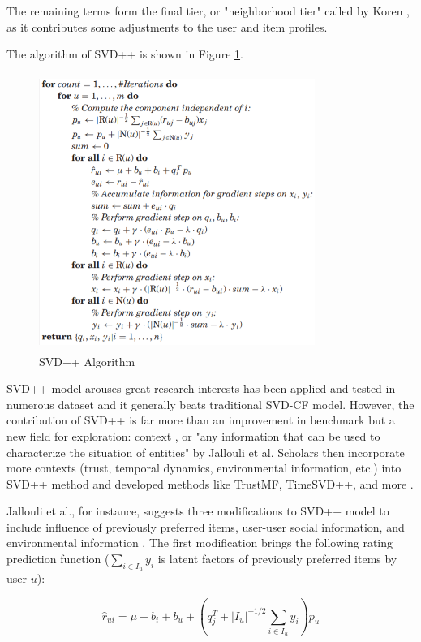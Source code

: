 \documentclass[letter paper, 11pt]{article}
\begin{document}
	The remaining terms form the final tier, or "neighborhood tier" called by Koren \cite{korenFactorization}, as it contributes some adjustments to the user and item profiles.
	
	The algorithm of SVD++ is shown in Figure \ref{SVD++-Algo}.
	
	\begin{figure}[H]
		\centering
		\caption{SVD++ Algorithm}
		\label{SVD++-Algo}
		\includegraphics[width=9cm, height=9cm]{SVD++.png}
	\end{figure}
	
	
	SVD++ model arouses great research interests has been applied and tested in numerous dataset \cite{SVD++performance} \cite{korenFactorization} and it generally beats traditional SVD-CF model. However, the contribution of SVD++ is far more than an improvement in benchmark but a new field for exploration: context \cite{contextual}, or "any information that can be used to characterize the situation of entities" by Jallouli et al. Scholars then incorporate more contexts (trust, temporal dynamics, environmental information, etc.) into SVD++ method and developed methods like TrustMF, TimeSVD++, and more \cite{contextual} \cite{review}.
	
			
	Jallouli et al., for instance, suggests three modifications to SVD++ model to include influence of previously preferred items, user-user social information, and environmental information \cite{contextual}. The first modification brings the following rating prediction function ($\sum_{i \in I_u} y_i$ is latent factors of previously preferred items by user $u$):
	
	\begin{equation}
		\hat{r}_{ui} = \mu + b_i + b_u  + (q_j^T + |I_u|^{-1/2}\sum_{i \in I_u} y_i) p_u
	\end{equation}
	
\end{document}
